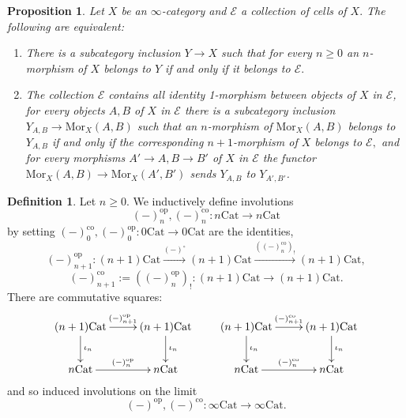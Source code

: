 \documentclass[10pt,oneside]{article}
\numberwithin{equation}{section} %
\numberwithin{figure}{section} %
\theoremstyle{plain}
\newtheorem{proposition}[theorem]{Proposition}
\theoremstyle{definition}
\newtheorem{definition}[theorem]{Definition}
\newcommand{\mE}{{\mathcal E}}
\newcommand{\n}{{n}}
\newcommand{\op}{\mathrm{op}}
\newcommand{\co}{\mathrm{co}}
\newcommand{\Cat}{\mathrm{Cat}}
\newcommand{\Mor}{{\mathrm{Mor}}}
\begin{document}
\begin{proposition}\label{subchar} Let $X$ be an $\infty$-category and $\mE$ a collection of cells of $X.$
The following are equivalent:

\begin{enumerate}[\normalfont(1)]\setlength{\itemsep}{-2pt}

\item There is a subcategory inclusion $Y \to X$ such that for every
$n \geq 0$ an $n$-morphism of $X$ belongs to $Y$ if and only if 
it belongs to $\mE.$


\item The collection $\mE$ contains all identity 1-morphism between objects of $X$ in $\mE$, for every objects $A, B $ of $ X$ in $\mE$ there is a subcategory inclusion $Y_{A,B} \to \Mor_X(A,B)$
such that an $n$-morphism of $\Mor_X(A,B)$ belongs to $Y_{A,B}$ if and only if the corresponding $n+1$-morphism of $X$ belongs to $\mE,$
and for every morphisms $A' \to A, B \to B' $ of $X$ in $\mE$ the functor $\Mor_X(A,B) \to \Mor_X(A',B')$ sends $Y_{A,B} $ to $Y_{A',B'} $.

\end{enumerate}


\end{proposition}

\begin{definition}\label{ruik} Let $\n \geq 0.$
We inductively define involutions $$(-)^\op_\n, (-)^\co_\n: \n\Cat \to \n\Cat$$ by setting
$(-)^\co_0, (-)^\op_0:  0\Cat \to 0\Cat$ are the identities, $$(-)^\op_{\n+1}: {(\n+1)}\Cat \xrightarrow{(-)^\circ} {(\n+1)}\Cat \xrightarrow{((-)^\co_\n)_!}{(\n+1)}\Cat, $$ $$(-)^\co_{\n+1}:=((-)^\op_\n)_!: {(\n+1)}\Cat \xrightarrow{ }{(\n+1)}\Cat.$$
There are commutative squares:
$$\begin{xy}
\xymatrix{
{(\n+1)}\Cat \ar[d]^{\iota_\n}  \ar[r]^{(-)_{\n+1}^\op} & {(\n+1)}\Cat  \ar[d]^{\iota_\n}
\\ 
{\n}\Cat \ar[r]^{(-)_{\n}^\op} & {\n}\Cat
}
\end{xy}
\qquad
\begin{xy}
\xymatrix{
{(\n+1)}\Cat \ar[d]^{\iota_\n}  \ar[r]^{(-)_{\n+1}^\co} & {(\n+1)}\Cat  \ar[d]^{\iota_\n}
\\ 
{\n}\Cat \ar[r]^{(-)_{\n}^\co} & {\n}\Cat
}
\end{xy}
$$
and so induced involutions on the limit $$(-)^\op, (-)^\co: \infty\Cat \to \infty\Cat. $$


\end{definition}
\end{document}
